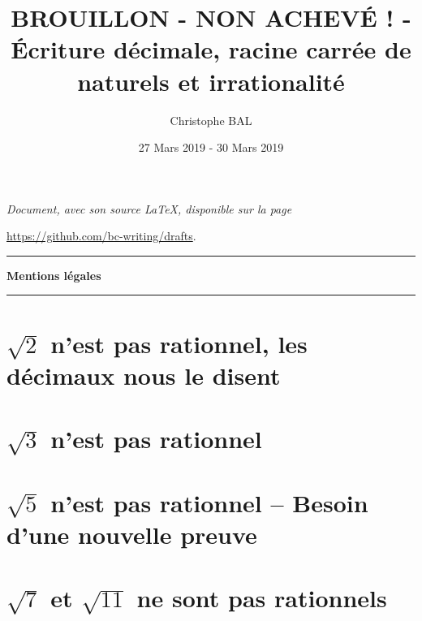\documentclass[12pt]{amsart}
\begin{document}
\title{BROUILLON - NON ACHEVÉ ! - Écriture décimale, racine carrée de naturels et irrationalité}
\author{Christophe BAL}
\date{27 Mars 2019 - 30 Mars 2019}

\maketitle

\begin{center}
	\itshape
	Document, avec son source \LaTeX, disponible sur la page
	
	\url{https://github.com/bc-writing/drafts}.
\end{center}


\bigskip


\begin{center}
	\hrule\vspace{.3em}
	{
		\fontsize{1.35em}{1em}\selectfont
		\textbf{Mentions \og légales \fg}
	}
			
	\vspace{0.45em}
	\doclicenseThis
	\hrule
\end{center}


\setcounter{tocdepth}{2}
\tableofcontents



\section{$\sqrt2$ n'est pas rationnel, les décimaux nous le disent}





\section{$\sqrt3$ n'est pas rationnel}




\section{$\sqrt5$ n'est pas rationnel -- Besoin d'une nouvelle preuve}





\section{$\sqrt7$ et $\sqrt{11}$ ne sont pas rationnels}
\end{document}
